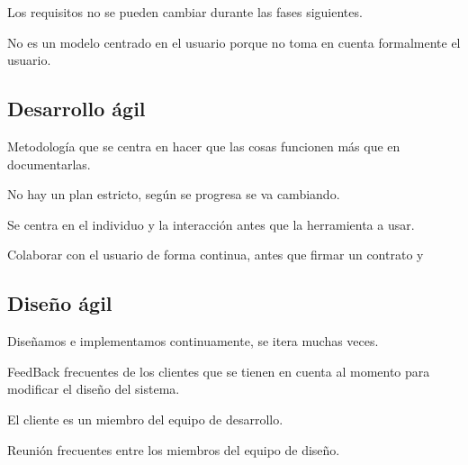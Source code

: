 \documentclass[12pt, twoside, openright]{report} %
\begin{document}
\begin{figure}[H]
{}
\end{figure}

Los requisitos no se pueden cambiar durante las fases siguientes.

No es un modelo centrado en el usuario porque no toma en cuenta
formalmente el usuario.
\pagebreak

\subsection{Desarrollo ágil}



Metodología que se centra en hacer que las cosas funcionen más que
en documentarlas.

No hay un plan estricto, según se progresa se va cambiando.

Se centra en el individuo y la interacción antes que la herramienta
a usar.

Colaborar con el usuario de forma continua, antes que firmar un
contrato y


\subsection{Diseño ágil}


Diseñamos e implementamos continuamente, se itera muchas veces.

FeedBack frecuentes de los clientes que se tienen en cuenta al
momento para modificar el diseño del sistema.

El cliente es un miembro del equipo de desarrollo.

Reunión frecuentes entre los miembros del equipo de diseño.
\end{document}
